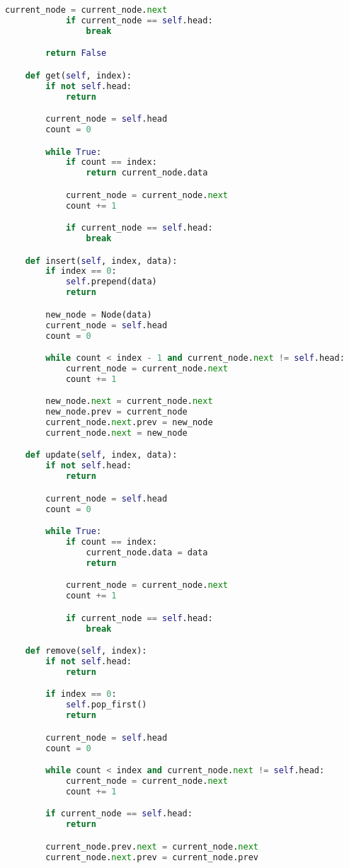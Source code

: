 \begin{lstlisting}[language=Python]
            current_node = current_node.next
            if current_node == self.head:
                break

        return False

    def get(self, index):
        if not self.head:
            return

        current_node = self.head
        count = 0

        while True:
            if count == index:
                return current_node.data

            current_node = current_node.next
            count += 1

            if current_node == self.head:
                break

    def insert(self, index, data):
        if index == 0:
            self.prepend(data)
            return

        new_node = Node(data)
        current_node = self.head
        count = 0

        while count < index - 1 and current_node.next != self.head:
            current_node = current_node.next
            count += 1

        new_node.next = current_node.next
        new_node.prev = current_node
        current_node.next.prev = new_node
        current_node.next = new_node

    def update(self, index, data):
        if not self.head:
            return

        current_node = self.head
        count = 0

        while True:
            if count == index:
                current_node.data = data
                return

            current_node = current_node.next
            count += 1

            if current_node == self.head:
                break

    def remove(self, index):
        if not self.head:
            return

        if index == 0:
            self.pop_first()
            return

        current_node = self.head
        count = 0

        while count < index and current_node.next != self.head:
            current_node = current_node.next
            count += 1

        if current_node == self.head:
            return

        current_node.prev.next = current_node.next
        current_node.next.prev = current_node.prev


\end{lstlisting}
